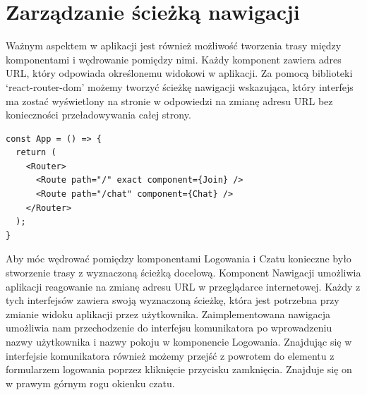 \section{Zarządzanie ścieżką nawigacji}
Ważnym aspektem w aplikacji jest również możliwość tworzenia trasy między komponentami i wędrowanie pomiędzy nimi. Każdy komponent zawiera adres URL, który odpowiada określonemu widokowi w aplikacji. Za pomocą biblioteki ‘react-router-dom’ możemy tworzyć ścieżkę nawigacji wskazująca, który interfejs ma zostać wyświetlony na stronie w odpowiedzi na zmianę adresu URL bez konieczności przeładowywania całej strony.
\begin{lstlisting}[caption=Implementacja sciezki nawigacji pomiedzy interfejsami]
const App = () => {
  return (
    <Router>
      <Route path="/" exact component={Join} />
      <Route path="/chat" component={Chat} />
    </Router>
  );
}
\end{lstlisting}
Aby móc wędrować pomiędzy komponentami Logowania i Czatu konieczne było stworzenie trasy z wyznaczoną ścieżką docelową. Komponent Nawigacji umożliwia aplikacji reagowanie na zmianę adresu URL w przeglądarce internetowej. Każdy z tych interfejsów zawiera swoją wyznaczoną ścieżkę, która jest potrzebna przy zmianie widoku aplikacji przez użytkownika. Zaimplementowana nawigacja umożliwia nam przechodzenie do interfejsu komunikatora po wprowadzeniu nazwy użytkownika i nazwy pokoju w komponencie Logowania. Znajdując się w interfejsie komunikatora również możemy przejść z powrotem do elementu z formularzem logowania poprzez kliknięcie przycisku zamknięcia. Znajduje się on w prawym górnym rogu okienku czatu.
